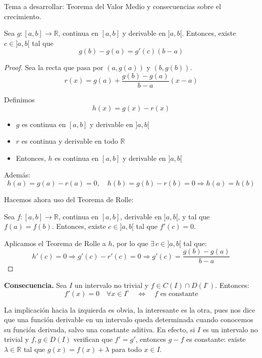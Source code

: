 \documentclass[12pt]{article}
\begin{document}
\setcounter{ejercicio}{0}
\begin{ejercicio}
    Tema a desarrollar: Teorema del Valor Medio y consecuencias sobre el crecimiento.


    \begin{teo} Sea \( g: [a, b] \to \mathbb{R} \), continua en \( [a, b] \) y derivable en \( ]a, b[ \).  
    Entonces, existe \( c \in ]a, b[ \) tal que
    \[
    g(b) - g(a) = g'(c)(b - a)
    \]
    \begin{proof}Sea la recta que pasa por \( (a, g(a)) \) y \( (b, g(b)) \).
    \[
    r(x) = g(a) + \frac{g(b) - g(a)}{b - a}(x - a)
        \]

    Definimos
    \[
    h(x) = g(x) - r(x)
    \]
    \begin{itemize}
        \item \( g \) es continua en \( [a, b] \) y derivable en \( ]a, b[ \)
        \item \( r \) es continua y derivable en todo \( \mathbb{R} \)
        \item Entonces, \( h \) es continua en \( [a, b] \) y derivable en \( ]a, b[ \)
    \end{itemize}

    Además:
    \[
    h(a) = g(a) - r(a) = 0, \quad h(b) = g(b) - r(b) = 0 \Rightarrow h(a) = h(b)
    \]

    Hacemos ahora uso del Teorema de Rolle:
    \begin{teo}[Rolle]  Sea \( f: [a, b] \to \mathbb{R} \), continua en \( [a, b] \), derivable en \( ]a, b[ \), y tal que \( f(a) = f(b) \).  
    Entonces, existe \( c \in ]a, b[ \) tal que \( f'(c) = 0 \).
    \end{teo}

    Aplicamos el Teorema de Rolle a \( h\), por lo que \( \exists\, c \in ]a, b[ \) tal que:
    \[
    h'(c) = 0 \Rightarrow g'(c) - r'(c) = 0 \Rightarrow g'(c) = \frac{g(b) - g(a)}{b - a}
    \]
    \end{proof}
    \end{teo}
    \textbf{Consecuencia.} Sea \( I \) un intervalo no trivial y \( f \in C(I) \cap D(I^\circ) \). Entonces:
    \[
    f'(x) = 0 \quad \forall x \in I^\circ \quad \Longleftrightarrow \quad f \text{ es constante}
    \]

    La implicación hacia la izquierda es obvia, la interesante es la otra, pues nos dice que una función derivable en un intervalo queda determinada cuando conocemos su función derivada, salvo una constante aditiva. En efecto, si \( I \) es un intervalo no trivial y \( f, g \in D(I) \) verifican que \( f' = g' \), entonces \( g - f \) es constante: existe \( \lambda \in \mathbb{R} \) tal que \( g(x) = f(x) + \lambda \) para todo \( x \in I \).


\end{ejercicio}
\end{document}
